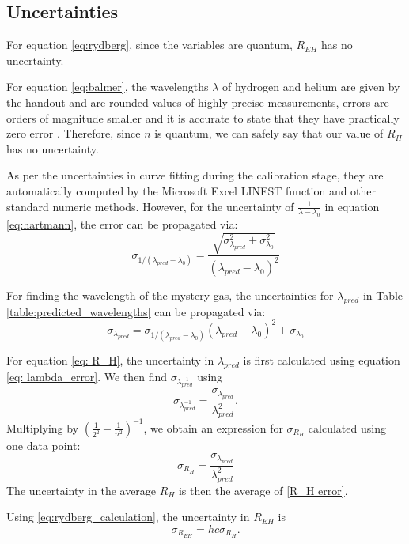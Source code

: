 \documentclass[12pt]{article}
\begin{document}
\subsection*{Uncertainties}
For equation \ref{eq:rydberg}, since the variables are quantum, $R_{EH}$ has no uncertainty.

For equation \ref{eq:balmer}, the wavelengths $\lambda$ of hydrogen and helium are given by the handout and are rounded values of highly precise measurements, errors are orders of magnitude smaller and it is accurate to state that they have practically zero error \autocite{manuall}. Therefore, since $n$ is quantum, we can safely say that our value of $R_H$ has no uncertainty.

As per the uncertainties in curve fitting during the calibration stage, they are automatically computed by the Microsoft Excel LINEST function and other standard numeric methods. However, for the uncertainty of $\frac{1}{\lambda-\lambda_0}$ in equation \ref{eq:hartmann}, the error can be propagated via:
$$\sigma_{ 1/(\lambda_{pred}-\lambda_0) } = \frac{ \sqrt{ \sigma_{\lambda_{pred}}^2 + \sigma_{\lambda_0}^2 } }{(\lambda_{pred} - \lambda_0)^2}$$


For finding the wavelength of the mystery gas, the uncertainties for $\lambda_{pred}$ in Table \ref{table:predicted_wavelengths} can be propagated via:
\begin{equation*}
    \sigma_{\lambda_{pred}}=\sigma_{1/(\lambda_{pred}-\lambda_0)}(\lambda_{pred}-\lambda_0)^2+\sigma_{\lambda_0}
    \label{eq: lambda_error}
\end{equation*}

For equation \ref{eq: R_H}, the uncertainty in $\lambda_{pred}$ is first calculated using equation \ref{eq: lambda_error}. We then find $\sigma_{\lambda_{pred}^{-1}}$ using 
\begin{equation}
    \sigma_{\lambda_{pred}^{-1}}=\frac{\sigma_{\lambda_{pred}}}{\lambda_{pred}^2}.
\end{equation}
Multiplying by $\left(\frac{1}{2^2}-\frac{1}{n^2} \right)^{-1}$, we obtain an expression for $\sigma_{R_H}$ calculated using one data point:
\begin{equation}
    \sigma_{R_H}=\frac{\sigma_{\lambda_{pred}}}{\lambda_{pred}^2}
    \label{R_H error}
\end{equation}
The uncertainty in the average $R_H$ is then the average of \ref{R_H error}.

Using \eqref{eq:rydberg_calculation}, the uncertainty in $R_{EH}$ is 
\begin{equation}
    \sigma_{R_{EH}}=hc\sigma_{R_H}.
\end{equation}
\end{document}
